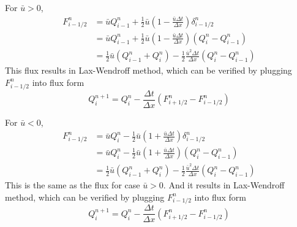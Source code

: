 \documentclass[11pt]{article}
\begin{document}
\begin{enumerate}
        \vskip 5pt
        \vskip 5pt
        	
        	For $\bar{u}>0$,
        	\begin{align*}
        		F_{i-1/2}^n&=\bar{u}Q_{i-1}^n+\frac{1}{2}\bar{u}(1-\frac{\bar{u}\Delta t}{\Delta x})\delta_{i-1/2}^n \\
        		&=\bar{u}Q_{i-1}^n+\frac{1}{2}\bar{u}(1-\frac{\bar{u}\Delta t}{\Delta x})(Q_i^n-Q_{i-1}^n)\\
        		&=\frac{1}{2}\bar{u}(Q_{i-1}^n+Q_i^n)-\frac{1}{2}\frac{\bar{u}^2\Delta t}{\Delta x}(Q_i^n-Q_{i-1}^n)
        	\end{align*}
        	This flux results in Lax-Wendroff method, which can be verified by plugging $F_{i-1/2}^n$ into flux form
        	\[
        	Q_i^{n+1}=Q_i^n-\frac{\Delta t}{\Delta x}(F_{i+1/2}^n-F_{i-1/2}^n)
        	\]
            
            For $\bar{u}<0$,
        	\begin{align*}
        	F_{i-1/2}^n&=\bar{u}Q_{i}^n-\frac{1}{2}\bar{u}(1+\frac{\bar{u}\Delta t}{\Delta x})\delta_{i-1/2}^n \\
        	&=\bar{u}Q_{i}^n-\frac{1}{2}\bar{u}(1+\frac{\bar{u}\Delta t}{\Delta x})(Q_i^n-Q_{i-1}^n)\\
        	&=\frac{1}{2}\bar{u}(Q_{i-1}^n+Q_i^n)-\frac{1}{2}\frac{\bar{u}^2\Delta t}{\Delta x}(Q_i^n-Q_{i-1}^n)
        	\end{align*}
        	This is the same as the flux for case $\bar{u}>0$. And it results in Lax-Wendroff method, which can be verified by plugging $F_{i-1/2}^n$ into flux form
        	\[
        	Q_i^{n+1}=Q_i^n-\frac{\Delta t}{\Delta x}(F_{i+1/2}^n-F_{i-1/2}^n)
        	\]
        	

\end{enumerate}
\end{document}
